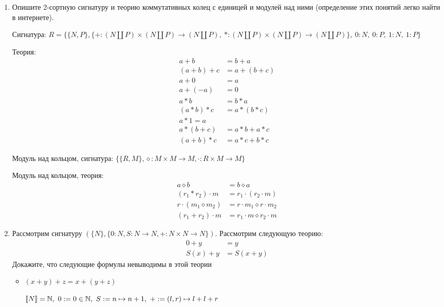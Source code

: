 \begin{enumerate}

\item Опишите 2-сортную сигнатуру и теорию коммутативных колец с единицей и модулей над ними (определение этих 
понятий легко найти в интернете).

Сигнатура: $R=\{ \{N, P\}, \{
+:(N \amalg P) \times (N \amalg P) \rightarrow (N \amalg P), \
*:(N \amalg P) \times (N \amalg P) \rightarrow (N \amalg P) \}, \ 
0:N, \ 
0:P, \ 
1:N, \ 
1:P
\}$
						   
Теория:
\begin{align*}
	a + b &= b + a \\
	(a + b) + c &= a + (b + c) \\
	a + 0 &= a \\
	a + (-a) &= 0 \\
	a * b &= b * a \\
	(a * b) * c &= a * (b * c) \\
	a * 1 = a \\
	a * (b + c) &= a * b + a * c \\
	(a + b) * c &= a * c + b * c
\end{align*}

Модуль над кольцом, сигнатура: $\{ \{R, M\}, \diamond : M\times M \rightarrow M, \cdot:R\times M \rightarrow M \}$

Модуль над кольцом, теория:
\begin{align*}
a \diamond b &= b \diamond a \\
(r_1 * r_2) \cdot m &= r_1 \cdot (r_2 \cdot m) \\
r\cdot (m_1 \diamond m_2) &= r\cdot m_1 \diamond r \cdot m_2 \\
(r_1 + r_2) \cdot m &= r_1 \cdot m \diamond r_2 \cdot m
\end{align*}


\item Рассмотрим сигнатуру $(\{N\}, \{ 0 : N, S : N \to N, + : N \times N \to N \})$.
    Рассмотрим следующую теорию:
\begin{align*}
0 + y & = y \\
S(x) + y & = S(x + y)
\end{align*}
Докажите, что следующие формулы невыводимы в этой теории
\begin{itemize}
\item $(x + y) + z = x + (y + z)$

$\llb N \rrb = \mathbb{N}, \
0 := 0 \in \mathbb{N},\
S := n \mapsto n + 1, \ 
+ := (l, r) \mapsto l + l + r$


\end{itemize}
\end{enumerate}
